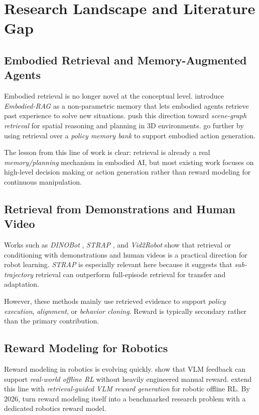 \section{Research Landscape and Literature Gap}

\subsection{Embodied Retrieval and Memory-Augmented Agents}

Embodied retrieval is no longer novel at the conceptual level.
\citet{liu2024embodiedrag} introduce \textit{Embodied-RAG} as a non-parametric memory
that lets embodied agents retrieve past experience to solve new situations.
\citet{li2025embodiedrag} push this direction toward \textit{scene-graph retrieval}
for spatial reasoning and planning in 3D environments.
\citet{xu2024raea} go further by using retrieval over a \textit{policy memory bank}
to support embodied action generation.

The lesson from this line of work is clear: retrieval is already a real
\textit{memory/planning} mechanism in embodied AI, but most existing work focuses on
high-level decision making or action generation rather than reward modeling for continuous manipulation.

\subsection{Retrieval from Demonstrations and Human Video}

Works such as \textit{DINOBot} \citep{johns2024dinobot}, \textit{STRAP} \citep{huang2025strap},
and \textit{Vid2Robot} \citep{jain2024vid2robot} show that retrieval or conditioning with
demonstrations and human videos is a practical direction for robot learning.
\textit{STRAP} is especially relevant here because it suggests that
\textit{sub-trajectory} retrieval can outperform full-episode retrieval for transfer and adaptation.

However, these methods mainly use retrieved evidence to support
\textit{policy execution}, \textit{alignment}, or \textit{behavior cloning}.
Reward is typically secondary rather than the primary contribution.

\subsection{Reward Modeling for Robotics}

Reward modeling in robotics is evolving quickly.
\citet{ma2024vlmfeedback} show that VLM feedback can support
\textit{real-world offline RL} without heavily engineered manual reward.
\citet{yang2025rgvlm} extend this line with \textit{retrieval-guided VLM reward generation}
for robotic offline RL.
By 2026, \citet{song2026roboreward} turn reward modeling itself into a benchmarked research problem with a dedicated robotics reward model.

